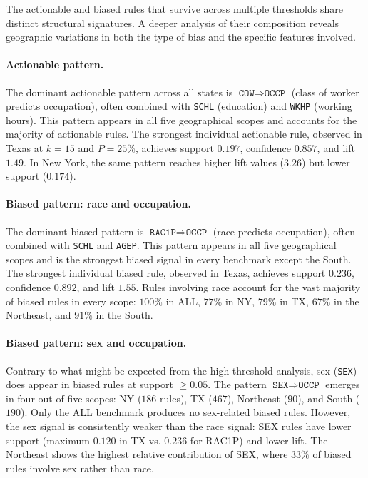 The actionable and biased rules that survive across multiple thresholds share distinct structural signatures. A deeper analysis of their composition reveals geographic variations in both the type of bias and the specific features involved.

\paragraph{Actionable pattern.} The dominant actionable pattern across all states is $\texttt{COW} \Rightarrow \texttt{OCCP}$ (class of worker predicts occupation), often combined with \texttt{SCHL} (education) and \texttt{WKHP} (working hours). This pattern appears in all five geographical scopes and accounts for the majority of actionable rules. The strongest individual actionable rule, observed in Texas at $k = 15$ and $P = 25\%$, achieves support $0.197$, confidence $0.857$, and lift $1.49$. In New York, the same pattern reaches higher lift values ($3.26$) but lower support ($0.174$).

\paragraph{Biased pattern: race and occupation.} The dominant biased pattern is $\texttt{RAC1P} \Rightarrow \texttt{OCCP}$ (race predicts occupation), often combined with \texttt{SCHL} and \texttt{AGEP}. This pattern appears in all five geographical scopes and is the strongest biased signal in every benchmark except the South. The strongest individual biased rule, observed in Texas, achieves support $0.236$, confidence $0.892$, and lift $1.55$. Rules involving race account for the vast majority of biased rules in every scope: $100\%$ in ALL, $77\%$ in NY, $79\%$ in TX, $67\%$ in the Northeast, and $91\%$ in the South.

\paragraph{Biased pattern: sex and occupation.} Contrary to what might be expected from the high-threshold analysis, sex (\texttt{SEX}) does appear in biased rules at support $\geq 0.05$. The pattern $\texttt{SEX} \Rightarrow \texttt{OCCP}$ emerges in four out of five scopes: NY ($186$ rules), TX ($467$), Northeast ($90$), and South ($190$). Only the ALL benchmark produces no sex-related biased rules. However, the sex signal is consistently weaker than the race signal: SEX rules have lower support (maximum $0.120$ in TX vs. $0.236$ for RAC1P) and lower lift. The Northeast shows the highest relative contribution of SEX, where $33\%$ of biased rules involve sex rather than race.

